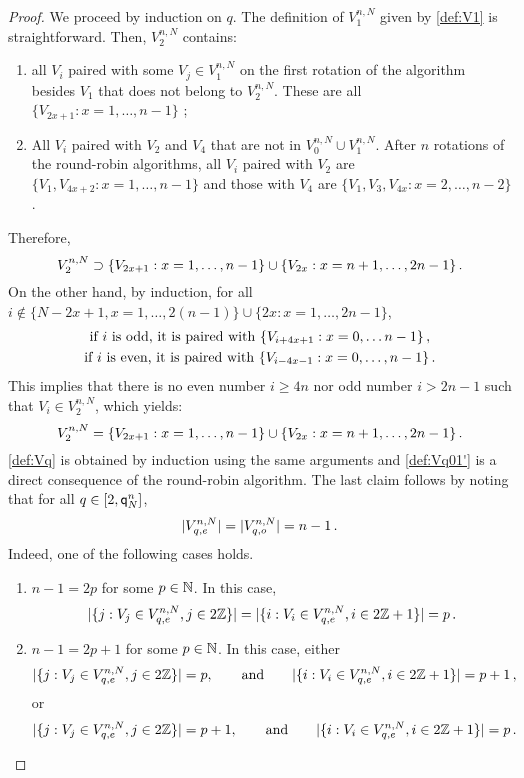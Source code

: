 \begin{proof}
\noindent
We proceed by induction on $q$.
The definition of $V_{1}^{n,N}$ given by \eqref{def:V1} is straightforward. Then, $V_{2}^{n,N}$ contains:
\begin{enumerate}[-]
\item all $V_i$ paired with some $V_j\in V_{1}^{n,N}$ on the first rotation of the algorithm besides $V_1$ that does not belong to $V_{2}^{n,N}$. These are all  $\{V_{2x+1} : x=1,\ldots,n-1\}$ ;
\item All $V_i$ paired with $V_2$ and $V_4$ that are not in $V_{0}^{n,N}\cup V_{1}^{n,N}$. After $n$ rotations of the round-robin algorithms, all $V_i$ paired with $V_2$ are $\{V_1,V_{4x+2} : x=1,\ldots,n-1\}$ and those with $V_4$ are $\{V_1,V_3,V_{4x} : x=2,\ldots,n-2\}$. 
\end{enumerate}
Therefore, 
\[
V_{2}^{n,N}\supset \{V_{2x+1} : x=1,\ldots,n-1\}\cup\{V_{2x} : x=n+1,\ldots,2n-1\}\,.
\]
On the other hand, by induction,  for all $i\notin \{N-2x+1, x=1,\ldots,2(n-1)\}\cup \{2x : x=1,\ldots, 2n-1\}$,
\begin{gather}
\notag\text{if }i \text{ is odd, it is paired with }\{V_{i+4x+1} : x=0,\ldots n-1\}\,,\\
\label{eq:Opponents}\text{if }i \text{ is even, it is paired with }\{V_{i-4x-1} : x=0,\ldots,n-1\}\,.
\end{gather}
This implies that there is no even number $i\ge 4n$ nor odd number $i>2n-1$ such that $V_i\in V_{2}^{n,N}$, which yields:
\begin{equation*}
 V_{2}^{n,N}= \{V_{2x+1} : x=1,\ldots,n-1\}\cup\{V_{2x} : x=n+1,\ldots,2n-1\}\,.
\end{equation*}
\eqref{def:Vq} is obtained by induction using the same arguments and \eqref{def:Vq01'} is a direct consequence of the round-robin algorithm. 
The last claim follows by noting that for all $q\in[2,{\mathsf{q}}^{n}_{N}]$,
\[
|V_{q,e}^{n,N}|=|V_{q,o}^{n,N}|=n-1\,.
\]
Indeed, one of the following cases holds.
\begin{enumerate}[-]
\item $n-1=2p$ for some $p\in \mathbb{N}$. In this case, 
\[
|\{j: V_j\in V_{q,e}^{n,N},j\in 2\mathbb{Z}\}|=|\{i : V_i\in V_{q,e}^{n,N},i\in 2\mathbb{Z}+1\}|=p\,.
\]
\item $n-1=2p+1$ for some $p\in \mathbb{N}$. In this case, either 
\[
|\{j: V_j\in V_{q,e}^{n,N},j\in 2\mathbb{Z}\}|=p,\qquad\text{and}\qquad |\{i : V_i\in V_{q,e}^{n,N},i\in 2\mathbb{Z}+1\}|=p+1\,,
\]
or 
\[
|\{j: V_j\in V_{q,e}^{n,N},j\in 2\mathbb{Z}\}|=p+1,\qquad\text{and}\qquad |\{i : V_i\in V_{q,e}^{n,N},i\in 2\mathbb{Z}+1\}|=p\,.
\]
\end{enumerate}
\end{proof}
%
%

